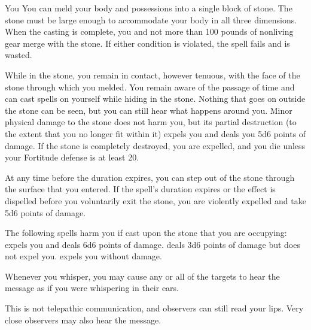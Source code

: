 \begin{spellheader}
    \spelldur{\durlong}
\end{spellheader}
\begin{spelleffects}
    \begin{spelltarget}{You}
        \spelleffect You can meld your body and possessions into a single block of stone. The stone must be large enough to accommodate your body in all three dimensions. When the casting is complete, you and not more than 100 pounds of nonliving gear merge with the stone. If either condition is violated, the spell fails and is wasted.
        \par While in the stone, you remain in contact, however tenuous, with the face of the stone through which you melded. You remain aware of the passage of time and can cast spells on yourself while hiding in the stone. Nothing that goes on outside the stone can be seen, but you can still hear what happens around you. Minor physical damage to the stone does not harm you, but its partial destruction (to the extent that you no longer fit within it) expels you and deals you 5d6 points of damage. If the stone is completely destroyed, you are expelled, and you die unless your Fortitude defense is at least 20.
        \par At any time before the duration expires, you can step out of the stone through the surface that you entered. If the spell's duration expires or the effect is dispelled before you voluntarily exit the stone, you are violently expelled and take 5d6 points of damage.
    \end{spelltarget}
\end{spelleffects}
\begin{spellfooter}
    \spellnotes The following spells harm you if cast upon the stone that you are occupying:  expels you and deals 6d6 points of damage.  deals 3d6 points of damage but does not expel you.  expels you without damage.
\end{spellfooter}

\begin{spellheader}
    \spellrng{\rngmed}
    \spelldur{\durlong}
\end{spellheader}
\begin{spelleffects}
    \spelleffect Whenever you whisper, you may cause any or all of the targets to hear the message as if you were whispering in their ears.
\end{spelleffects}
\begin{spellfooter}
    \spellnotes This is not telepathic communication, and observers can still read your lips. Very close observers may also hear the message.
\end{spellfooter}

